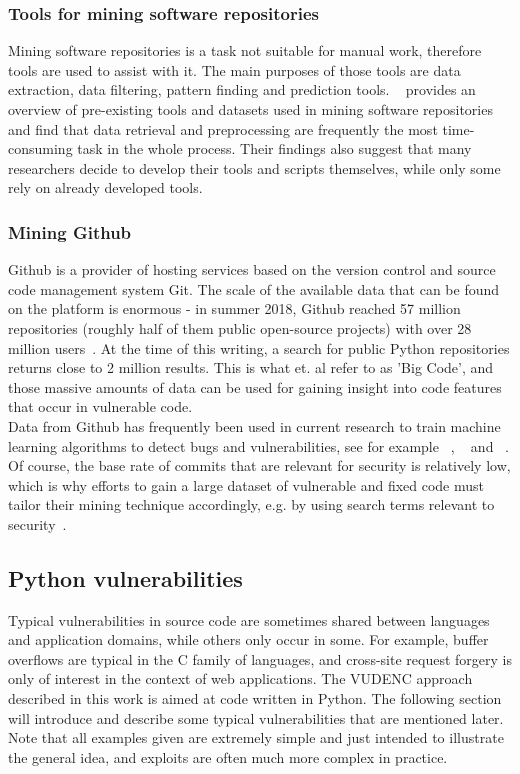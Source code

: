 \documentclass[
	a4paper,
	pagesize,
	pdftex,
	12pt,
	twoside, %
	BCOR=5mm, %
	ngerman,
	fleqn,
	final,
	]{scrartcl}
\begin{document}
\subsubsection{Tools for mining software repositories}
Mining software repositories is a task not suitable for manual work, therefore tools are used to assist with it. The main purposes of those tools are data extraction, data filtering, pattern finding and prediction tools. ~\cite{Chaturvedi.2013} provides an overview of pre-existing tools and datasets used in mining software repositories and find that data retrieval and preprocessing are frequently the most time-consuming task in the whole process. Their findings also suggest that many researchers decide to develop their tools and scripts themselves, while only some rely on already developed tools. 
\subsubsection{Mining Github}
Github is a provider of hosting services based on the version control and source code management system Git. The scale of the available data that can be found on the platform is enormous - in summer 2018, Github reached 57 million repositories (roughly half of them public open-source projects) with over 28 million users~\cite{Github.com.b}. At the time of this writing, a search for public Python repositories returns close to 2 million results. This is what \cite{Allamanis.2018} et. al refer to as 'Big Code', and those massive amounts of data can be used for gaining insight into code features that occur in vulnerable code.\\
Data from Github has frequently been used in current research to train machine learning algorithms to detect bugs and vulnerabilities, see for example ~\cite{Zhou.2017}, ~\cite{Russell.2018} and ~\cite{Liu.2018}. Of course, the base rate of commits that are relevant for security is relatively low, which is why efforts to gain a large dataset of vulnerable and fixed code must tailor their mining technique accordingly, e.g. by using search terms relevant to security~\cite{Zhou.2017}.

\subsection{Python vulnerabilities}

Typical vulnerabilities in source code are sometimes shared between languages and application domains, while others only occur in some. For example, buffer overflows are typical in the C family of languages, and cross-site request forgery is only of interest in the context of web applications. The VUDENC approach described in this work is aimed at code written in Python. The following section will introduce and describe some typical vulnerabilities that are mentioned later. Note that all examples given are extremely simple and just intended to illustrate the general idea, and exploits are often much more complex in practice.
\end{document}
